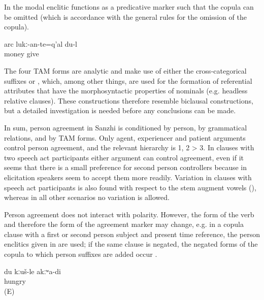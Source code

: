In  the modal enclitic  functions as a predicative marker such that the copula can be omitted (which is accordance with the general rules for the omission of the copula).
 
 
\begin{exe}

	\ex	\label{ex:‎‎‎I have to give the money back}
	\gll	arc	lukː-an-te=q'al	du-l\\
		money	give	\\
	\glt	{}
\end{exe}


The four TAM forms are analytic and make use of either the cross-categorical suffixes  or , which, among other things, are used for the formation of referential attributes that have the morphosyntactic properties of nominals (e.g. headless relative clauses). These constructions therefore resemble biclausal constructions, but a detailed investigation is needed before any conclusions can be made.



In sum, person agreement in Sanzhi is conditioned by person, by grammatical relations, and by TAM forms. Only agent, experiencer and patient arguments control person agreement, and the relevant hierarchy is 1, 2 > 3. In clauses with two speech act participants either argument can control agreement, even if it seems that there is a small preference for second person controllers because in elicitation speakers seem to accept them more readily. Variation in clauses with speech act participants is also found with respect to the stem augment vowels (), whereas in all other scenarios no variation is allowed.


Person agreement does not interact with polarity. However, the form of the verb and therefore the form of the agreement marker may change, e.g. in a copula clause with a first or second person subject and present time reference, the person enclitics given in  are used; if the same clause is negated, the negated forms of the copula to which person suffixes are added occur . 
%
\begin{exe}
	\ex	\label{ex:I am not hungry@24}
	\gll	du	kːuš-le	akːʷa-di\\
			hungry	\\
	\glt	{} (E)
\end{exe}

